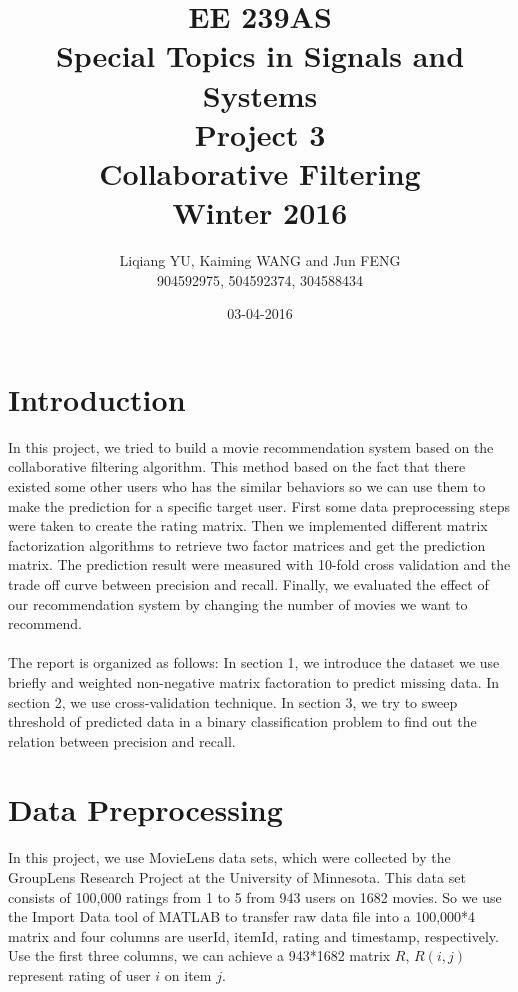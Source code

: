 \documentclass{article}
\begin{document}
\begin{titlepage}
\title{EE 239AS \\Special Topics in Signals and Systems\\Project 3\\Collaborative Filtering\\Winter 2016} 
\author{Liqiang YU, Kaiming WANG and Jun FENG\\
904592975, 504592374, 304588434} 
\date{03-04-2016}
\end{titlepage}

\maketitle
\newpage
\tableofcontents
\newpage
\section{Introduction}
In this project, we tried to build a movie recommendation system based on the collaborative filtering algorithm. This method based on the fact that there existed some other users who has the similar behaviors so we can use them to make the prediction for a specific target user. First some data preprocessing steps were taken to create the rating matrix. Then we implemented different matrix factorization algorithms to retrieve two factor matrices and get the prediction matrix. The prediction result were measured with 10-fold cross validation and the trade off curve between precision and recall. Finally, we evaluated the effect of our recommendation system by changing the number of movies we want to recommend.\\
\\
The report is organized as follows: In section 1, we introduce the dataset we use briefly and weighted non-negative matrix factoration to predict missing data. In section 2, we use cross-validation technique. In section 3, we try to sweep threshold of predicted data in a binary classification problem to find out the relation between precision and recall.
\section{Data Preprocessing}
In this project, we use MovieLens data sets, which were collected by the GroupLens Research Project at the University of Minnesota. This data set consists of 100,000 ratings from 1 to 5 from 943 users on 1682 movies. So we use the Import Data tool of MATLAB to transfer raw data file into a 100,000*4 matrix and four columns are userId, itemId, rating and timestamp, respectively. Use the first three columns, we can achieve a 943*1682 matrix $R$, $R(i,j)$ represent rating of user $i$ on item $j$.
\end{document}
